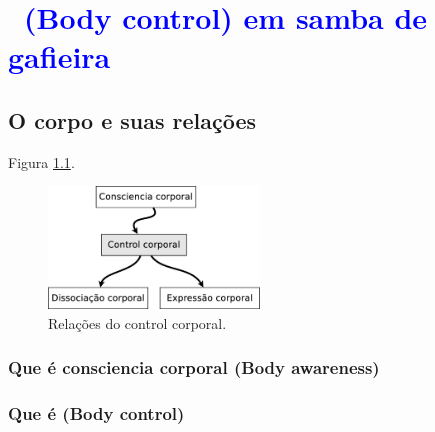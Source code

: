 

\chapter{\textcolor{blue}{ \Bodycontrol~(Body control) em samba de gafieira }}

\section{ O corpo e suas relações}


Figura \ref{fig:bodycontroltotal}.

\begin{figure}[!h]
  \centering
    \includegraphics[width=0.5\textwidth]{chapters/cap-body-control/total.eps}
\caption{Relações do control corporal.}
\label{fig:bodycontroltotal}
\end{figure}


\subsection{Que é consciencia corporal (Body awareness)}
\cite[pp. 11]{balcells2002expresion}
\cite{bueno2016psicomotricidade}
\cite[pp. 232]{gaiarsameio}
\cite[pp. 61]{aranha2002desenvolvimento}
\cite[pp. 75]{vallejo2001cuerpo}

\subsection{Que é \Bodycontrol (Body control)}

\cite{bolio2006fantasia}
\cite[pp. 215]{moreno2008expresion}

